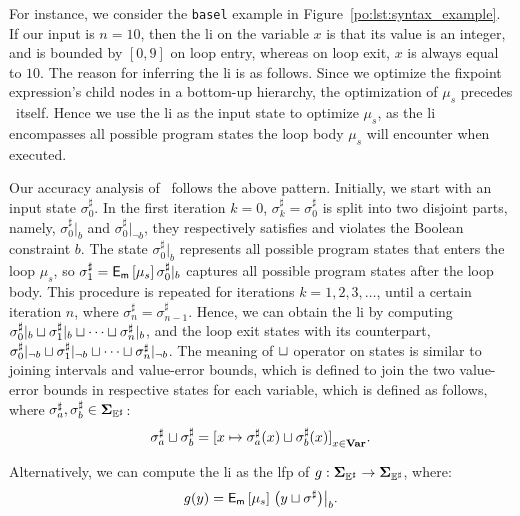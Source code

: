 For instance, we consider the \verb|basel| example in
Figure~\ref{po:lst:syntax_example}.  If our input is $n = 10$, then the
\gls{li} on the variable $x$ is that its value is an integer, and is bounded
by $[0, 9]$ on loop entry, whereas on loop exit, $x$ is always equal to $10$.
The reason for inferring the \gls{li} is as follows.  Since we optimize the
fixpoint expression's child nodes in a bottom-up hierarchy, the optimization of
$\mu_s$ precedes \fixexprmir~itself.  Hence we use the \gls{li} as the input
state to optimize $\mu_s$, as the \gls{li} encompasses all possible program
states the loop body $\mu_s$ will encounter when executed.

Our accuracy analysis of \fixexprmir~follows the above pattern.
Initially, we start with an input state $\sigma^\sharp_0$.  In the first
iteration $k = 0$, $\sigma^\sharp_k = \sigma^\sharp_0$ is split into two
disjoint parts, namely, $\sigma^\sharp_0|_b$ and $\sigma^\sharp_0|_{\neg b}$,
they respectively satisfies and violates the Boolean constraint $b$.  The state
$\sigma^\sharp_0|_b$ represents all possible program states that enters the
loop $\mu_s$, so $\sigma^\sharp_1 = \operatorname{\mathsf{E}_\mathsf{m}}\left[{\mu_s}\right]{\sigma^\sharp_0|_b}$
captures all possible program states after the loop body.  This procedure
is repeated for iterations $k = 1, 2, 3, \ldots$, until a certain iteration
$n$, where $\sigma^\sharp_n = \sigma^\sharp_{n-1}$.  Hence, we can obtain the
\gls{li} by computing $\sigma^\sharp_0|_b \sqcup \sigma^\sharp_1|_b \sqcup \cdots
\sqcup \sigma^\sharp_n|_b$, and the loop exit states with its counterpart,
\ie~$\sigma^\sharp_0|_{\neg b} \sqcup \sigma^\sharp_1|_{\neg b} \sqcup \cdots
\sqcup \sigma^\sharp_n|_{\neg b}$.  The meaning of $\sqcup$ operator on states is
similar to joining intervals and value-error bounds, which is defined to join
the two value-error bounds in respective states for each variable, which is
defined as follows, where $\sigma^\sharp_a, \sigma^\sharp_b \in \mathbf{\Sigma}_{\mathbb{E}^\sharp}$:
\begin{equation}
    \sigma^\sharp_a \join \sigma^\sharp_b =
        {%
            [ x \mapsto \sigma^\sharp_a(x) \join \sigma^\sharp_b(x) ]
        }_{x \in \varset}.
\end{equation}

Alternatively, we can compute the \gls{li} as the \gls{lfp} of $g: \mathbf{\Sigma}_{\mathbb{E}^\sharp}
\to \mathbf{\Sigma}_{\mathbb{E}^\sharp}$, where:
\begin{equation}
    g(y) = \operatorname{\mathsf{E}_\mathsf{m}}\left[{\mu_s}\right]{
        \left.\left( y \ensuremath\sqcup\sigma^\sharp \right)\right|_b
    }.
\end{equation}

